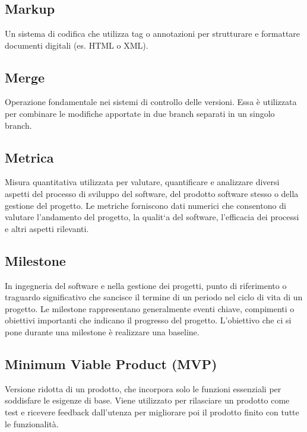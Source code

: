 
\section{}

\hypertarget{sec:markup}{}
\subsection*{Markup}
Un sistema di codifica che utilizza tag o annotazioni per strutturare e formattare documenti digitali (es. HTML o XML).

\hypertarget{sec:merge}{}
\subsection*{Merge}
Operazione fondamentale nei sistemi di controllo delle versioni. Essa è utilizzata per combinare le modifiche apportate in due branch separati in un 
singolo branch.

\hypertarget{sec:metrica}{}
\subsection*{Metrica}
Misura quantitativa utilizzata per valutare, quantificare e analizzare diversi aspetti del processo di sviluppo del software, del prodotto software stesso o della gestione del
progetto. Le metriche forniscono dati numerici che consentono di valutare l’andamento del
progetto, la qualit`a del software, l’efficacia dei processi e altri aspetti rilevanti.

\subsection*{Milestone}
In ingegneria del software e nella gestione dei progetti, punto di riferimento o traguardo significativo che sancisce il termine di un periodo nel ciclo 
di vita di un progetto. Le milestone rappresentano generalmente eventi chiave, compimenti o obiettivi importanti che indicano il progresso del progetto. 
L’obiettivo che ci si pone durante una milestone è realizzare una baseline.

\hypertarget{sec:MVP}{}
\subsection*{Minimum Viable Product (MVP)}
Versione ridotta di un prodotto, che incorpora solo le funzioni essenziali per soddisfare le esigenze di base. Viene utilizzato per rilasciare un prodotto 
come test e ricevere feedback dall’utenza per migliorare poi il prodotto finito con tutte le funzionalità.

